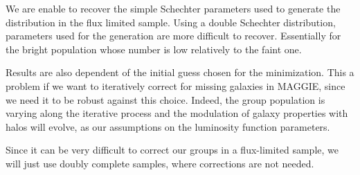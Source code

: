 %
We are enable to recover the simple Schechter parameters used to generate
the distribution in the flux limited sample. Using a double Schechter
distribution, parameters used for the generation are more difficult to
recover. Essentially for the bright population whose number is low
relatively to the faint one.

Results are also dependent of the initial guess chosen for the minimization.
This a problem if we want to iteratively correct for missing galaxies in
MAGGIE, since we need it to be robust against this choice. Indeed, the group
population is varying along the iterative process and the modulation of
galaxy properties with halos will evolve, as our assumptions on the
luminosity function parameters.

Since it can be very difficult to correct our groups in a flux-limited
sample, we will just use doubly complete samples, where corrections are not
needed.
%
